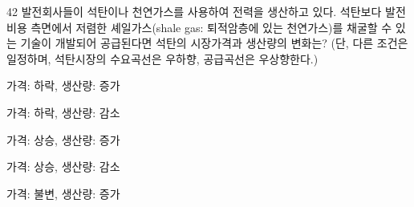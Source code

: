 \begin{question}{42}
발전회사들이 석탄이나 천연가스를 사용하여 전력을 생산하고 있다. 석탄보다 발전비용 측면에서 저렴한 셰일가스(shale gas: 퇴적암층에 있는 천연가스)를 채굴할 수 있는 기술이 개발되어 공급된다면 석탄의 시장가격과 생산량의 변화는? (단, 다른 조건은 일정하며, 석탄시장의 수요곡선은 우하향, 공급곡선은 우상향한다.)
\begin{choices}
  \item 가격: 하락, 생산량: 증가
  \item 가격: 하락, 생산량: 감소
  \item 가격: 상승, 생산량: 증가
  \item 가격: 상승, 생산량: 감소
  \item 가격: 불변, 생산량: 증가
\end{choices}
\end{question}

